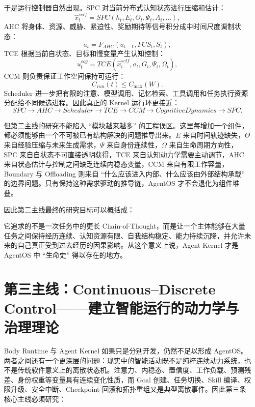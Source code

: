 于是运行控制器自然出现。SPC 对当前分布式认知状态进行压缩和估计：
\[
\hat x^{self}_t
=
SPC
\left(
h_t,E_t,\Theta_t,\Psi_t,A_t,\ldots
\right),
\]
AHC 将身体、资源、威胁、紧迫性、奖励期待等信号积分成中时间尺度调制状态：
\[
a_t
=
F_{AHC}
(a_{t-1},FCS_t,S_t),
\]
TCE 根据当前自状态、目标和慢变量产生认知控制：
\[
u^{cog}_t
=
TCE
\left(
\hat x^{self}_t,a_t,G_t,\Psi_t,\Omega_t
\right),
\]
CCM 则负责保证工作空间保持可运行：
\[
C_{run}(t)\leq C_{\max}(W).
\]
Scheduler 进一步把有限的注意、模型调用、记忆检索、工具调用和任务执行资源分配给不同候选进程。因此真正的 Kernel 运行环更接近：
\[
SPC
\rightarrow
AHC
\rightarrow
Scheduler
\rightarrow
TCE
\rightarrow
CCM
\rightarrow
CognitiveDynamics
\rightarrow
SPC.
\]

但第二主线的研究不能陷入 ``模块越来越多'' 的工程误区。这里每增加一个组件，都必须能够由一个不可被已有结构解决的问题推导出来。$E$ 来自时间轨迹缺失，$\Theta$ 来自经验压缩与未来生成需求，$\Psi$ 来自身份连续性，$\Omega$ 来自生命周期方向性，SPC 来自自状态不可直接透明获得，TCE 来自认知动力学需要主动调节，AHC 来自状态估计与控制之间缺乏连续内稳态变量，CCM 来自有限工作容量，Boundary 与 Offloading 则来自 ``什么应该进入内部、什么应该由外部结构承载'' 的边界问题。只有保持这种需求驱动的推导链，AgentOS 才不会退化为组件堆叠。

因此第二主线最终的研究目标可以概括成：
\begin{statementbox}
\centering
{}
\end{statementbox}
它追求的不是一次任务中的更长 Chain-of-Thought，而是让一个主体能够在大量任务之间保持经历连续、认知资源有限、自我结构稳定、能力持续沉降，并允许未来的自己真正受到过去经历的因果影响。从这个意义上说，Agent Kernel 才是 AgentOS 中 ``生命史'' 得以存在的地方。

\section{第三主线：Continuous--Discrete Control——建立智能运行的动力学与治理理论}
\label{sec:roadmap-continuous-discrete-control}

Body Runtime 与 Agent Kernel 如果只是分别开发，仍然不足以形成 AgentOS。两者之间还有一个更深层的问题：现实中的智能活动既不是纯粹连续动力系统，也不是传统软件意义上的离散状态机。注意力、内稳态、置信度、工作负载、预测残差、身份权重等变量具有连续变化性质，而 Goal 创建、任务切换、Skill 编译、权限升级、安全中断、Checkpoint 回滚和拓扑重组又是典型离散事件。因此第三条核心主线必须研究：
\begin{statementbox}
\centering
{}
\end{statementbox}

